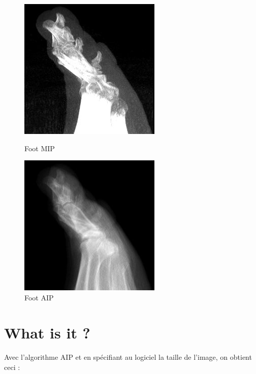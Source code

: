 \documentclass[a4paper,11pt]{article}
\begin{document}
\begin{figure}[!h]
	\begin{minipage}[c]{.42\linewidth}
     \center
	\includegraphics[scale=0.5]{foot_MIP.jpg}
	\caption{Foot MIP}
   \end{minipage} \hfill
	\begin{minipage}[c]{.42\linewidth}
      \center
	\includegraphics[scale=0.5]{foot_AIP.jpg}
	\caption{Foot AIP}
   \end{minipage} \hfill
\end{figure}

\paragraph{}
\paragraph{}

\section{What is it ?}

\paragraph{}
Avec l'algorithme AIP et en spécifiant au logiciel la taille de l'image, on obtient ceci :
\end{document}
